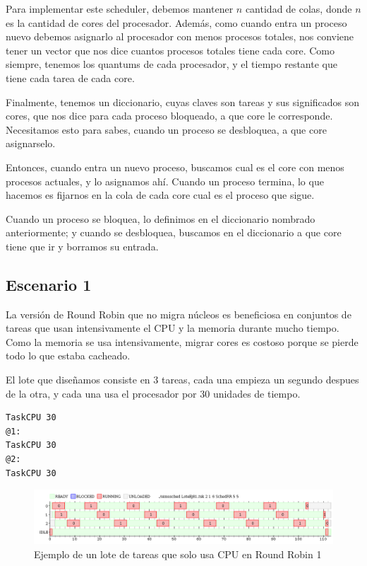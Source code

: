 

Para implementar este scheduler, debemos mantener $n$ cantidad de colas, donde $n$ es la cantidad de cores del procesador. Además, como cuando entra un proceso nuevo debemos asignarlo al procesador con menos procesos totales, nos conviene tener un vector que nos dice cuantos procesos totales tiene cada core. Como siempre, tenemos los quantums de cada procesador, y el tiempo restante que tiene cada tarea de cada core. 

Finalmente, tenemos un diccionario, cuyas claves son tareas y sus significados son cores, que nos dice para cada proceso bloqueado, a que core le corresponde. Necesitamos esto para sabes, cuando un proceso se desbloquea, a que core asignarselo.

Entonces, cuando entra un nuevo proceso, buscamos cual es el core con menos procesos actuales, y lo asignamos ahí. Cuando un proceso termina, lo que hacemos es fijarnos en la cola de cada core cual es el proceso que sigue.

Cuando un proceso se bloquea, lo definimos en el diccionario nombrado anteriormente; y cuando se desbloquea, buscamos en el diccionario a que core tiene que ir y borramos su entrada.

\subsection{Escenario 1}

La versión de Round Robin que no migra núcleos es beneficiosa en conjuntos de tareas que usan intensivamente el CPU y la memoria durante mucho tiempo. Como la memoria se usa intensivamente, migrar cores es costoso porque se pierde todo lo que estaba cacheado. 

El lote que diseñamos consiste en 3 tareas, cada una empieza un segundo despues de la otra, y cada una usa el procesador por 30 unidades de tiempo.

\begin{lstlisting}
TaskCPU 30
@1:
TaskCPU 30
@2:
TaskCPU 30
\end{lstlisting}


\begin{figure}[H]
\caption{Ejemplo de un lote de tareas que solo usa CPU en Round Robin 1}
\label{fig:ej8-11}
\includegraphics[width=1\textwidth]{imgs/ej8-1rr.png}
\end{figure}

